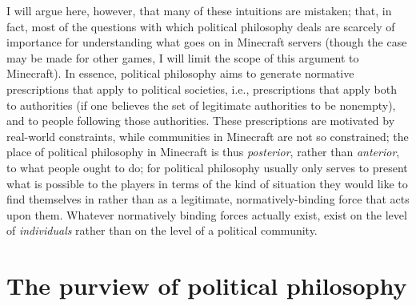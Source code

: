 I will argue here, however, that many of these intuitions are mistaken; that, in fact, most of the questions with which political philosophy deals are scarcely of importance for understanding what goes on in Minecraft servers (though the case may be made for other games, I will limit the scope of this argument to Minecraft). In essence, political philosophy aims to generate normative prescriptions that apply to political societies, i.e., prescriptions that apply both to authorities (if one believes the set of legitimate authorities to be nonempty), and to people following those authorities. These prescriptions are motivated by real-world constraints, while communities in Minecraft are not so constrained; the place of political philosophy in Minecraft is thus \emph{posterior}, rather than \emph{anterior}, to what people ought to do; for political philosophy usually only serves to present what is possible to the players in terms of the kind of situation they would like to find themselves in rather than as a legitimate, normatively-binding force that acts upon them. Whatever normatively binding forces actually exist, exist on the level of \emph{individuals} rather than on the level of a political community.

\section{The purview of political philosophy}
